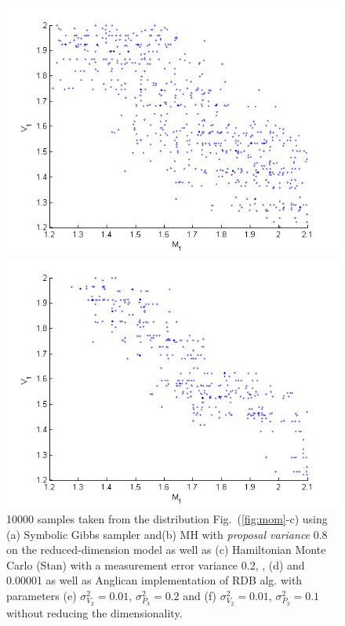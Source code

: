 \documentclass{article}
\newcommand{\nn}{0.16}
\begin{document}
\begin{figure}
\begin{center}
\begin{minipage}[b]{\nn\textwidth}
                \includegraphics[width=1\textwidth]{Figs2/col_c_ang10000_02_001.png}
        \end{minipage}%
\begin{minipage}[b]{\nn\textwidth}
                \includegraphics[width=1\textwidth]{Figs2/col_c_ang_10000_01_001}
        \end{minipage}%
\end{center}
\vspace{-1mm}
\caption{\footnotesize
10000 samples taken from the distribution Fig.~(\ref{fig:mom}-c)
using (a) Symbolic Gibbs sampler and(b) MH with \emph{proposal variance} 0.8 
on the reduced-dimension model as well as  
(c) Hamiltonian Monte Carlo (Stan) with a measurement error variance 0.2, 
, (d) and 0.00001 as well as Anglican implementation of RDB alg. with 
parameters (e)
$\sigma^2_{V_2} = 0.01$, $\sigma^2_{P_3} = 0.2$ and 
(f) $\sigma^2_{V_2} = 0.01$, $\sigma^2_{P_3} = 0.1$
without reducing the dimensionality.
}
\label{fig:mom2}
\end{figure}
\end{document}

